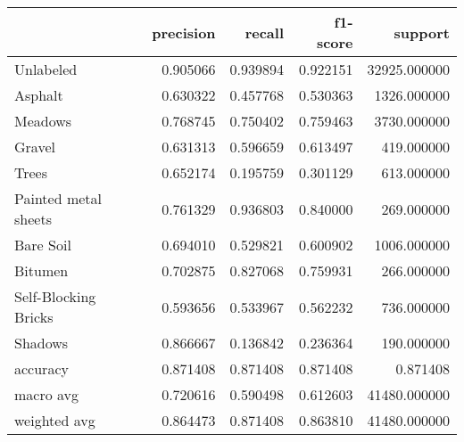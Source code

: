 \begin{tabular}{lrrrr}
\toprule
{} &  precision &    recall &  f1-score &       support \\
\midrule
Unlabeled            &   0.905066 &  0.939894 &  0.922151 &  32925.000000 \\
Asphalt              &   0.630322 &  0.457768 &  0.530363 &   1326.000000 \\
Meadows              &   0.768745 &  0.750402 &  0.759463 &   3730.000000 \\
Gravel               &   0.631313 &  0.596659 &  0.613497 &    419.000000 \\
Trees                &   0.652174 &  0.195759 &  0.301129 &    613.000000 \\
Painted metal sheets &   0.761329 &  0.936803 &  0.840000 &    269.000000 \\
Bare Soil            &   0.694010 &  0.529821 &  0.600902 &   1006.000000 \\
Bitumen              &   0.702875 &  0.827068 &  0.759931 &    266.000000 \\
Self-Blocking Bricks &   0.593656 &  0.533967 &  0.562232 &    736.000000 \\
Shadows              &   0.866667 &  0.136842 &  0.236364 &    190.000000 \\
accuracy             &   0.871408 &  0.871408 &  0.871408 &      0.871408 \\
macro avg            &   0.720616 &  0.590498 &  0.612603 &  41480.000000 \\
weighted avg         &   0.864473 &  0.871408 &  0.863810 &  41480.000000 \\
\bottomrule
\end{tabular}
